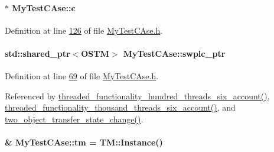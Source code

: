 \paragraph[{\texorpdfstring{c}{c}}]{ $\ast$ My\+Test\+C\+Ase\+::c\hspace{0.3cm}{\ttfamily [private]}}\hypertarget{class_my_test_c_ase_a9b2a4413041a47316ddc140e862e3bcc_a9b2a4413041a47316ddc140e862e3bcc}{}\label{class_my_test_c_ase_a9b2a4413041a47316ddc140e862e3bcc_a9b2a4413041a47316ddc140e862e3bcc}


Definition at line \hyperlink{_my_test_c_ase_8h_source_l00126}{126} of file \hyperlink{_my_test_c_ase_8h_source}{My\+Test\+C\+Ase.\+h}.

\paragraph[{\texorpdfstring{swplc\+\_\+ptr}{swplc_ptr}}]{\setlength{\rightskip}{0pt plus 5cm}std\+::shared\+\_\+ptr$<${\bf O\+S\+TM}$>$ My\+Test\+C\+Ase\+::swplc\+\_\+ptr}\hypertarget{class_my_test_c_ase_aa8ccae9a5a7feb5bc47591c55a82d0cd_aa8ccae9a5a7feb5bc47591c55a82d0cd}{}\label{class_my_test_c_ase_aa8ccae9a5a7feb5bc47591c55a82d0cd_aa8ccae9a5a7feb5bc47591c55a82d0cd}


Definition at line \hyperlink{_my_test_c_ase_8h_source_l00069}{69} of file \hyperlink{_my_test_c_ase_8h_source}{My\+Test\+C\+Ase.\+h}.



Referenced by \hyperlink{_my_test_c_ase_8cpp_source_l00589}{threaded\+\_\+functionality\+\_\+hundred\+\_\+threads\+\_\+six\+\_\+account()}, \hyperlink{_my_test_c_ase_8cpp_source_l00634}{threaded\+\_\+functionality\+\_\+thousand\+\_\+threads\+\_\+six\+\_\+account()}, and \hyperlink{_my_test_c_ase_8cpp_source_l00765}{two\+\_\+object\+\_\+transfer\+\_\+state\+\_\+change()}.

\paragraph[{\texorpdfstring{tm}{tm}}]{\& My\+Test\+C\+Ase\+::tm = {\bf T\+M\+::\+Instance}()}\hypertarget{class_my_test_c_ase_a422e6e5d4ddedea384be96031c89b72b_a422e6e5d4ddedea384be96031c89b72b}{}\label{class_my_test_c_ase_a422e6e5d4ddedea384be96031c89b72b_a422e6e5d4ddedea384be96031c89b72b}


